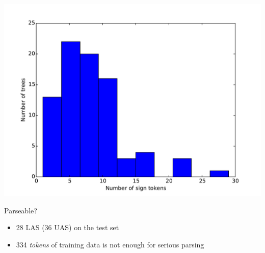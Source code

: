 \documentclass[final]{beamer}
\begin{document}
\begin{frame}{}
\begin{columns}[t]
\begin{column}{.48\linewidth}
           \begin{center}
            \includegraphics[width=1.0\linewidth]{../nodalida2017/treesizes.pdf}
           \end{center}

            \begin{block}{\large Parseable?}
                \begin{itemize}
                    \item 28 LAS (36 UAS) on the test set
                    \item 334 \emph{tokens} of training data is not enough for
                        serious parsing
                \end{itemize}
            \end{block}



\end{column}
\end{columns}
\end{frame}
\end{document}
